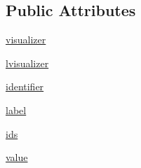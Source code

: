 \subsection*{Public Attributes}
\begin{DoxyCompactItemize}
\item 
\hyperlink{class_element_1_1_element_a7a5b8e1891bf065fa81f51a8f6b4212e}{visualizer}
\item 
\hyperlink{class_element_1_1_element_a130630f8ecfe9255c9e0a514949be201}{lvisualizer}
\item 
\hyperlink{class_element_1_1_element_a2202a62a079908d52afc0b7796be2981}{identifier}
\item 
\hyperlink{class_element_1_1_element_a1eaadb79747dd83097612cac742976fa}{label}
\item 
\hyperlink{class_element_1_1_element_aaba03a76f52e1bb4ba6ac1b0184be90f}{ids}
\item 
\hyperlink{class_element_1_1_element_ae9c30f7574a4356686d93e4567cf61f8}{value}
\end{DoxyCompactItemize}
